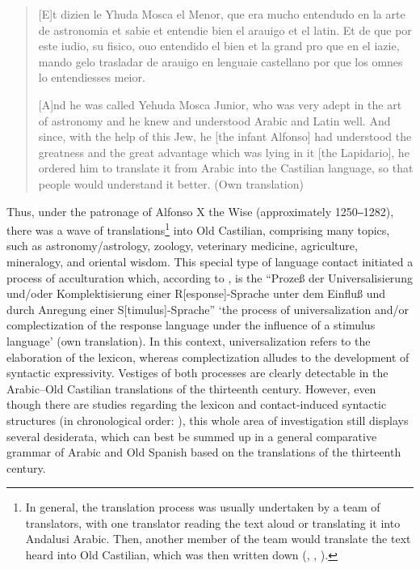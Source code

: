 \documentclass[output=paper]{langscibook}
\begin{document}
\begin{quote}
    [E]t dizien le Yhuda Mosca el Menor, que era mucho entendudo en la arte de astronomia et sabie et entendie bien el arauigo et el latin. Et de que por este iudio, su fisico, ouo entendido el bien et la grand pro que en el iazie, mando gelo trasladar de arauigo en lenguaie castellano por que los omnes lo entendiesses meior. \citep[19]{rodriguez_m_montalvo_lapidario_1981} 


    [A]nd he was called Yehuda Mosca Junior, who was very adept in the art of astronomy and he knew and understood Arabic and Latin well. And since, with the help of this Jew, he [the infant Alfonso] had understood the greatness and the great advantage which was lying in it [the Lapidario], he ordered him to translate it from Arabic into the Castilian language, so that people would understand it better. (Own translation)
\end{quote}


Thus, under the patronage of Alfonso X the Wise (approximately 1250‒1282), there was a wave of translations\footnote{In general, the translation process was usually undertaken by a team of translators, with one translator reading the text aloud or translating it into Andalusi Arabic. Then, another member of the team would translate the text heard into Old Castilian, which was then written down (\citealt[3]{hilty_libro_1954}, \citealt[XXIX]{hilty_aly_2005}, \citealt[19]{rodriguez_m_montalvo_lapidario_1981}).} into Old Castilian, comprising many topics, such as astronomy/astrology, zoology, veterinary medicine, agriculture, mineralogy, and oriental wisdom. This special type of language contact \citep{dohla_traduccion_2008-1,hasler_ubersetzung_2001} initiated a process of acculturation which, according to \citet[6]{bossong_probleme_1979}, is the “Prozeß der Universalisierung und/oder Komplektisierung einer R[esponse]-Sprache unter dem Einfluß und durch Anregung einer S[timulus]-Sprache” ‘the process of universalization and/or complectization of the response language under the influence of a stimulus language’ (own translation). In this context, universalization refers to the elaboration of the lexicon, whereas complectization alludes to the development of syntactic expressivity. Vestiges of both processes are clearly detectable in the Arabic–Old Castilian translations of the thirteenth century. However, even though there are studies regarding the lexicon \citep{bossong_canones_1978,bossong_probleme_1979,dohla_libro_2009} and contact-induced syntactic structures (in chronological order: \cite{tallgren_acerca_1934,dietrich_beitrage_1937,hottinger_kalila_1958,huffman_syntactical_1973}), this whole area of investigation still displays several desiderata, which can best be summed up in a general comparative grammar of Arabic and Old Spanish based on the translations of the thirteenth century. 
\end{document}
